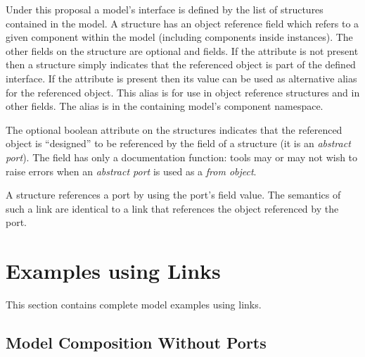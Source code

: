\documentclass{cekarticle}
\begin{document}
Under this proposal a model's interface is defined by the list of  structures contained in the model.
A  structure has an object reference field which refers to a given component within the model (including
components inside instances).  The other fields on the  structure are optional  and
 fields.  If the  attribute is not present then a  structure simply indicates
that the referenced object is part of the defined interface.  If the  attribute is present then its value
can be used as alternative alias for the referenced object.  This alias is for use in object reference structures and
in other  fields.  The alias is in the containing model's component namespace.

The  optional boolean attribute on the  structures indicates that the referenced
object is ``designed'' to be referenced by the  field of a  structure (it is an \emph{abstract port}).
The  field has only a documentation function: tools may or may not wish to raise errors when an
\emph{abstract port} is used as a \emph{from object}.

A  structure references a port by using the port's  field value.
The semantics of such a link are identical to a link that references the object referenced by the port.

\section{Examples using Links}
\label{sec:linkexamples}

This section contains complete model examples using links.

\subsection{Model Composition Without Ports}
\label{sec:eg}
\end{document}
